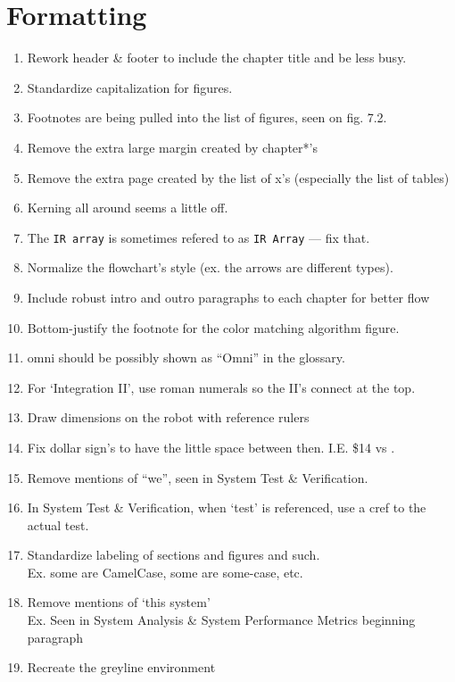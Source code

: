 \documentclass[11pt]{article}
\begin{document}
\section{Formatting}
\begin{enumerate}
    \item Rework header \& footer to include the chapter title and be less busy.
    \item Standardize capitalization for figures.
    \item Footnotes are being pulled into the list of figures, seen on fig. 7.2.
    \item Remove the extra large margin created by chapter*'s
    \item Remove the extra page created by the list of x's (especially the list of tables)
    \item Kerning all around seems a little off.
    \item The \texttt{IR array} is sometimes refered to as \texttt{IR Array} --- fix that.
    \item Normalize the flowchart's style (ex. the arrows are different types).
    \item Include robust intro and outro paragraphs to each chapter for better flow
    \item Bottom-justify the footnote for the color matching algorithm figure.
    \item omni should be possibly shown as ``Omni'' in the glossary.
    \item For `Integration II', use roman numerals so the II's connect at the top.
    \item Draw dimensions on the robot with reference rulers
    \item Fix dollar sign's to have the little space between then. I.E. \$14 vs \Dollars[14].
    \item Remove mentions of ``we'', seen in System Test \& Verification.
    \item In System Test \& Verification, when `test' is referenced, use a cref to the actual test.
    \item Standardize labeling of sections and figures and such.
        \quad \\ Ex. some are CamelCase, some are some-case, etc.
    \item Remove mentions of `this system'
        \quad \\ Ex. Seen in System Analysis \& System Performance Metrics beginning paragraph
    \item Recreate the greyline environment

\end{enumerate}
\end{document}
